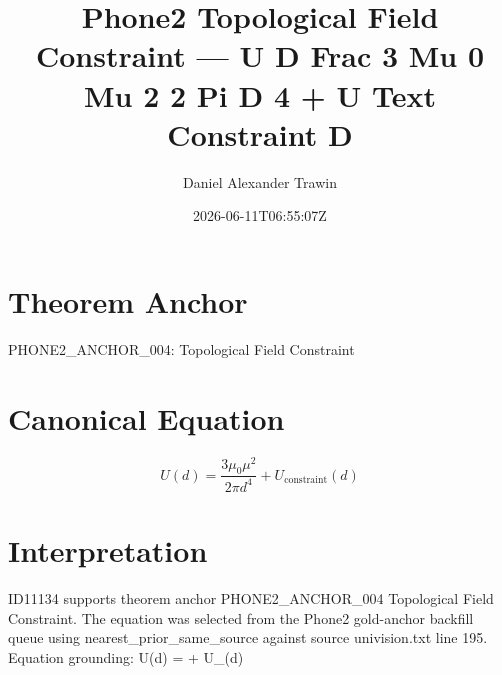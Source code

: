\documentclass[11pt]{article}
\title{Phone2 Topological Field Constraint — U D Frac 3 Mu 0 Mu 2 2 Pi D 4 + U Text Constraint D}
\author{Daniel Alexander Trawin}
\date{2026-06-11T06:55:07Z}
\begin{document}
\maketitle
\section*{Theorem Anchor}
PHONE2_ANCHOR_004: Topological Field Constraint
\section*{Canonical Equation}
\[
U(d) = \frac{3\mu_0\mu^2}{2\pi d^4} + U_{\text{constraint}}(d)
\]
\section*{Interpretation}
ID11134 supports theorem anchor PHONE2_ANCHOR_004 Topological Field Constraint. The equation was selected from the Phone2 gold-anchor backfill queue using nearest_prior_same_source against source univision.txt line 195. Equation grounding: U(d) =  + U_{}(d)
\end{document}

